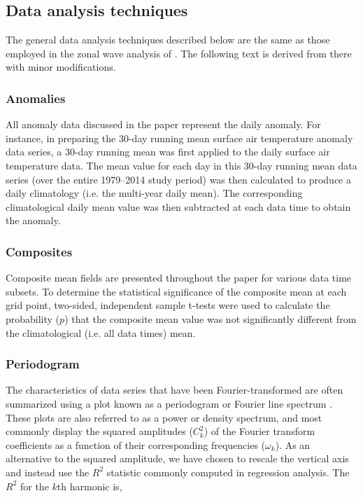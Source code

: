 \subsection{Data analysis techniques}

The general data analysis techniques described below are the same as those employed in the zonal wave analysis of \citet{IrvingSimmonds2015}. The following text is derived from there with minor modifications.

\subsubsection{Anomalies}
All anomaly data discussed in the paper represent the daily anomaly. For instance, in preparing the 30-day running mean surface air temperature anomaly data series, a 30-day running mean was first applied to the daily surface air temperature data. The mean value for each day in this 30-day running mean data series (over the entire 1979--2014 study period) was then calculated to produce a daily climatology (i.e. the multi-year daily mean). The corresponding climatological daily mean value was then subtracted at each data time to obtain the anomaly.  

\subsubsection{Composites}
Composite mean fields are presented throughout the paper for various data time subsets. To determine the statistical significance of the composite mean at each grid point, two-sided, independent sample t-tests were used to calculate the probability ($p$) that the composite mean value was not significantly different from the climatological (i.e. all data times) mean.

\subsubsection{Periodogram}

The characteristics of data series that have been Fourier-transformed are often summarized using a plot known as a periodogram or Fourier line spectrum \citep{Wilks2011}. These plots are also referred to as a power or density spectrum, and most commonly display the squared amplitudes ($C_k^2$) of the Fourier transform coefficients as a function of their corresponding frequencies ($\omega_k$). As an alternative to the squared amplitude, we have chosen to rescale the vertical axis and instead use the $R^2$ statistic commonly computed in regression analysis. The $R^2$ for the $k$th harmonic is,

